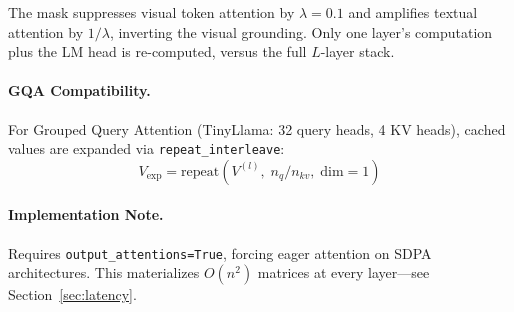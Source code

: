 \documentclass[10pt,twocolumn]{article}
\begin{document}
\smallskip
\noindent{}\label{alg:cvge}

\smallskip
The mask suppresses visual token attention by $\lambda=0.1$ and amplifies textual attention by $1/\lambda$, inverting the visual grounding. Only one layer's computation plus the LM head is re-computed, versus the full $L$-layer stack.

\paragraph{GQA Compatibility.} For Grouped Query Attention (TinyLlama: 32 query heads, 4 KV heads), cached values are expanded via \texttt{repeat\_interleave}:
\begin{equation}
V_{\text{exp}} = \text{repeat}(V^{(l)},\; n_q / n_{kv},\; \text{dim}=1) \label{eq:gqa}
\end{equation}

\paragraph{Implementation Note.} Requires \texttt{output\_attentions=True}, forcing eager attention on SDPA architectures. This materializes $O(n^2)$ matrices at every layer---see Section~\ref{sec:latency}.
\end{document}
